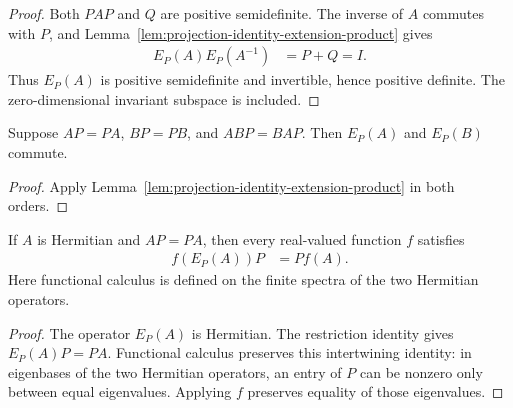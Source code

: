 \begin{proof}
\leanok
Both $PAP$ and $Q$ are positive semidefinite. The inverse of $A$ commutes
with $P$, and Lemma~\ref{lem:projection-identity-extension-product} gives
\begin{align*}
 E_P(A)E_P(A^{-1})&=P+Q=I.
\end{align*}
Thus $E_P(A)$ is positive semidefinite and invertible, hence positive definite.
The zero-dimensional invariant subspace is included.
\end{proof}

\begin{lemma}
\label{lem:projection-identity-extension-commutation}
\leanok
Suppose $AP=PA$, $BP=PB$, and $ABP=BAP$. Then $E_P(A)$ and $E_P(B)$ commute.
\end{lemma}

\begin{proof}
\leanok
Apply Lemma~\ref{lem:projection-identity-extension-product} in both orders.
\end{proof}

\begin{lemma}
\label{lem:projection-identity-extension-functional-calculus}
\leanok
If $A$ is Hermitian and $AP=PA$, then every real-valued function $f$ satisfies
\begin{align*}
 f(E_P(A))P&=Pf(A).
\end{align*}
Here functional calculus is defined on the finite spectra of the two
Hermitian operators.
\end{lemma}

\begin{proof}
\leanok
The operator $E_P(A)$ is Hermitian. The restriction identity gives
$E_P(A)P=PA$. Functional calculus preserves this intertwining identity:
in eigenbases of the two Hermitian operators, an entry of $P$ can be nonzero
only between equal eigenvalues. Applying $f$ preserves equality of those
eigenvalues.
\end{proof}
